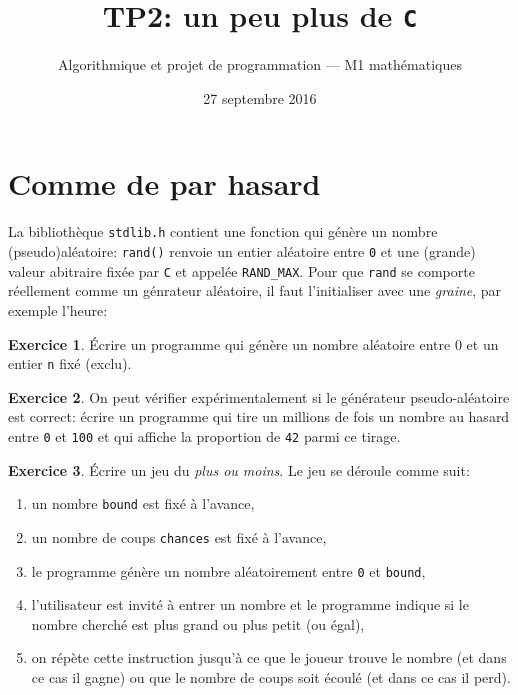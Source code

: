 \documentclass[french,a4paper]{article}
\title{\sffamily TP2: un peu plus de {\tt C}}
\date{27 septembre 2016}
\author{Algorithmique et projet de programmation --- M1 mathématiques}
\theoremstyle{definition}
\newtheorem{exercise}{Exercice}
\theoremstyle{remark}
\newcommand{\inlinec}[1]{\lstinline[style=C]°#1°}
\begin{document}
\maketitle

\section{Comme de par hasard}
\label{sec:random}

La bibliothèque \inlinec{stdlib.h} contient une fonction qui génère un
nombre (pseudo)aléatoire: \inlinec{rand()} renvoie un entier aléatoire
entre \inlinec{0} et une (grande) valeur abitraire fixée par {\tt C}
et appelée \inlinec{RAND_MAX}. Pour que \inlinec{rand} se comporte
réellement comme un génrateur aléatoire, il faut l'initialiser avec
une {\em graine}, par exemple l'heure: 

\begin{exercise}
  \'Ecrire un programme qui génère un nombre aléatoire entre 0 et un
  entier \inlinec{n} fixé (exclu).
\end{exercise}

\begin{exercise}
  \label{exo:simulate-42}%
  On peut vérifier expérimentalement si le générateur pseudo-aléatoire
  est correct: écrire un programme qui tire un millions de fois un
  nombre au hasard entre \inlinec{0} et \inlinec{100} et qui affiche
  la proportion de \inlinec{42} parmi ce tirage.
\end{exercise}

\begin{exercise}
  \'Ecrire un jeu du {\em plus ou moins}. Le jeu se déroule comme suit:
  \begin{enumerate}[label=(\arabic*)]
  \item un nombre \inlinec{bound} est fixé à l'avance,
  \item un nombre de coups \inlinec{chances} est fixé à l'avance,
  \item le programme génère un nombre aléatoirement entre \inlinec{0}
    et \inlinec{bound},
  \item l'utilisateur est invité à entrer un nombre et le programme
    indique si le nombre cherché est plus grand ou plus petit (ou
    égal),
  \item on répète cette instruction jusqu'à ce que le joueur trouve le
    nombre (et dans ce cas il gagne) ou que le nombre de coups soit
    écoulé (et dans ce cas il perd).
  \end{enumerate}
\end{exercise}
\end{document}
